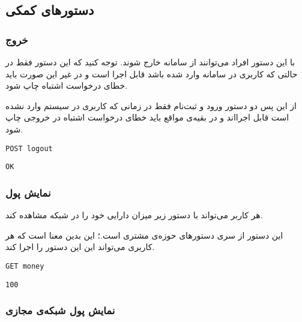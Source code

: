 \documentclass{utap}
\begin{document}
    \subsection{دستورهای کمکی}

    \subsubsection{خروج}

    با این دستور افراد می‌توانند از سامانه خارج شوند. توجه کنید که این دستور فقط در حالتی که کاربری در سامانه وارد شده باشد قابل اجرا است و در غیر این صورت باید خطای درخواست اشتباه چاپ شود.

    از این پس دو دستور ورود و ثبت‌نام فقط در زمانی که کاربری در سیستم وارد نشده است قابل اجرااند و در بقیه‌ی مواقع باید خطای درخواست اشتباه در خروجی چاپ شود.

    \begin{latin}
        \begin{Verbatim}[frame=lines,label={\rl{دستور ورودی}}]
POST logout
        \end{Verbatim}
        \begin{Verbatim}[frame=lines,label={\rl{خروجی}}]
OK
        \end{Verbatim}
    \end{latin}

    \subsubsection{نمایش پول}

    هر کاربر می‌تواند با دستور زیر میزان دارایی خود را در شبکه مشاهده کند.

    این دستور از سری دستورهای حوزه‌ی مشتری است.؛ این بدین معنا است که هر کاربری می‌تواند این این دستور را اجرا کند.‌

    \begin{latin}
        \begin{Verbatim}[frame=lines,label={\rl{دستور ورودی}}]
GET money
        \end{Verbatim}
        \begin{Verbatim}[frame=lines,label={\rl{خروجی}}]
100
        \end{Verbatim}
    \end{latin}

    \subsubsection{نمایش پول شبکه‌ی مجازی}
\end{document}
